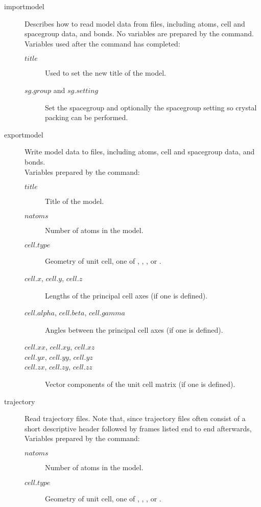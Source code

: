 \begin{description}

	\item[importmodel\its]
	Describes how to read model data from files, including atoms, cell and spacegroup data, and bonds.
	No variables are prepared by the command. Variables used after the command has completed:
	\begin{description}
		\item[$title$\its]
			Used to set the new title of the model.
		\item[$sg.group$ and $sg.setting$\its]
			Set the spacegroup and optionally the spacegroup setting so crystal packing can be performed.
	\end{description}

	\item[exportmodel\its]
	Write model data to files, including atoms, cell and spacegroup data, and bonds.\\
	Variables prepared by the command:
	\begin{description}
		\item[$title$\its]
			Title of the model.
		\item[$natoms$\its]
			Number of atoms in the model.
		\item[$cell.type$\its]
			Geometry of unit cell, one of , , , or .
		\item[$cell.x$, $cell.y$, $cell.z$\its]
			Lengths of the principal cell axes (if one is defined).
		\item[$cell.alpha$, $cell.beta$, $cell.gamma$\its]
			Angles between the principal cell axes (if one is defined).
		\item[$cell.xx$, $cell.xy$, $cell.xz$]
		\item[$cell.yx$, $cell.yy$, $cell.yz$]
		\item[$cell.zx$, $cell.zy$, $cell.zz$\its]
			Vector components of the unit cell matrix (if one is defined).
	\end{description}

	\item[trajectory]
	Read trajectory files. Note that, since trajectory files often consist of a short descriptive header followed by frames listed end to end afterwards, 
	Variables prepared by the command:
	\begin{description}
		\item[$natoms$\its]
			Number of atoms in the model.
		\item[$cell.type$\its]
			Geometry of unit cell, one of , , , or .
	\end{description}


\end{description}
